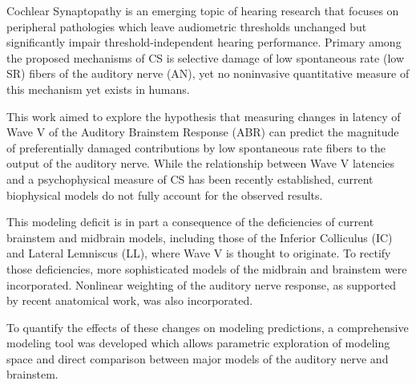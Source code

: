 Cochlear Synaptopathy is an emerging topic of hearing research that focuses on peripheral pathologies which leave audiometric thresholds unchanged but significantly impair threshold-independent hearing performance. Primary among the proposed mechanisms of CS is selective damage of low spontaneous rate (low SR) fibers of the auditory nerve (AN), yet no noninvasive quantitative measure of this mechanism yet exists in humans.

This work aimed to explore the hypothesis that measuring changes in latency of Wave V of the Auditory Brainstem Response (ABR) can predict the magnitude of preferentially damaged contributions by low spontaneous rate fibers to the output of the auditory nerve. While the relationship between Wave V latencies and a psychophysical measure of CS has been recently established, current biophysical models do not fully account for the observed results.

This modeling deficit is in part a consequence of the deficiencies of current brainstem and midbrain models, including those of the Inferior Colliculus (IC) and Lateral Lemniscus (LL), where Wave V is thought to originate.  To rectify those deficiencies, more sophisticated models of the midbrain and brainstem were incorporated.  Nonlinear weighting of the auditory nerve response, as supported by recent anatomical work, was also incorporated.  

To quantify the effects of these changes on modeling predictions, a comprehensive modeling tool was developed which allows parametric exploration of modeling space and direct comparison between major models of the auditory nerve and brainstem. 